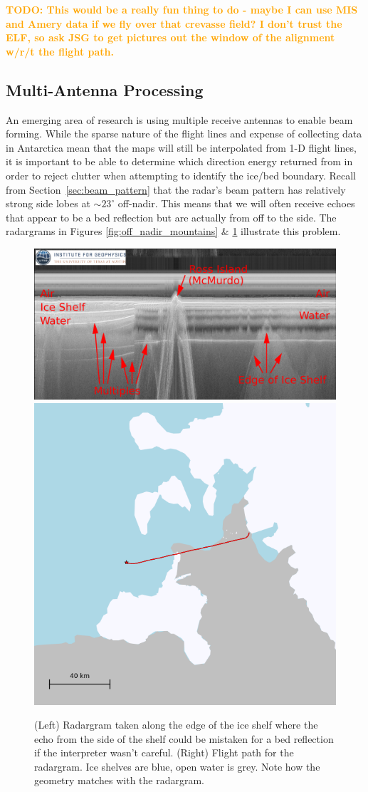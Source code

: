 \documentclass[11pt]{article}
\newcommand{\future}[1]{\ifthenelse{\boolean{include-future}} {\textcolor{Orange}{\textbf{TODO: #1}}}{}}
\newcommand{\secref}[1]{Section~\ref{#1}}
\begin{document}
\future{This would be a really fun thing to do - maybe I can use MIS and Amery data if we fly over that crevasse field? I don't trust the ELF, so ask JSG to get pictures out the window of the alignment w/r/t the flight path.}


\subsection{Multi-Antenna Processing}

An emerging area of research is using multiple receive antennas to enable beam forming.
While the sparse nature of the flight lines and expense of collecting data in Antarctica mean that the maps will still be interpolated from 1-D flight lines, it is important to be able to determine which direction energy returned from in order to reject clutter when attempting to identify the ice/bed boundary.
Recall from \secref{sec:beam_pattern} that the radar's beam pattern has relatively strong side lobes at $\sim23^\circ$ off-nadir.
This means that we will often receive echoes that appear to be a bed reflection but are actually from off to the side. 
The radargrams in Figures \ref{fig:off_nadir_mountains} \& \ref{fig:off_nadir_ice_shelf} illustrate this problem.

\begin{figure}[ht!]
\centering
\includegraphics[width=0.6\columnwidth]{figures/MIS_JKB2e_Y25a_full.png}
\includegraphics[width=0.3\columnwidth]{figures/MIS_JKB2e_Y25a_0.png}
\caption[]{(Left) Radargram taken along the edge of the ice shelf where the echo from the side of the shelf could be mistaken for a bed reflection if the interpreter wasn't careful. (Right) Flight path for the radargram. Ice shelves are blue, open water is grey. Note how the geometry matches with the radargram.}
\label{fig:off_nadir_ice_shelf}
\end{figure}
\end{document}
